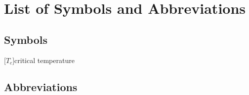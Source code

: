 \chapter*{List of Symbols and Abbreviations}

\section*{Symbols}
\begin{acronym}[$T_c$]
  [$T_c$]{critical temperature}
\end{acronym}

\section*{Abbreviations}
\begin{acronym}[LONGEST]
\end{acronym}


